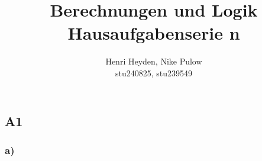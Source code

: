 \documentclass[12pt, a4paper]{article}
\title{Berechnungen und Logik\\Hausaufgabenserie n}
\author{Henri Heyden, Nike Pulow \\ \small stu240825, stu239549}
\date{}
\begin{document}
\maketitle

\doublespacing
\vspace*{-2cm}
\subsection*{A1}
\subsubsection*{a)}
\end{document}
